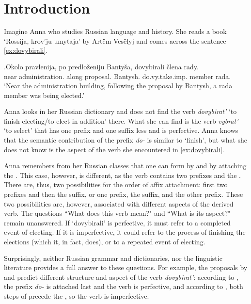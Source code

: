 
\chapter{Introduction} %
\label{Chapter1}
Imagine Anna who studies Russian language and history. She reads a book `Rossija, krov'ju umytaja' by Art\"{e}m Ves\"{e}lyj  and comes across the sentence \ref{ex:dovybirali}.

\exg.\label{ex:dovybirali}Okolo pravlenija, po predlo\v{z}eniju Banty\v{s}a, dovybirali \v{c}lena rady.\\
near administration. along proposal. Bantysh. do.vy.take.imp. member rada.\\
\vspace{0.3em}
`Near the administration building, following the proposal by Bantysh, a rada member was being elected.'

Anna looks in her Russian dictionary and does not find the verb \textit{dovybirat'} `to finish electing/to elect in addition' there.  What she can find is the verb \textit{vybrat'} `to select'  that has one prefix and one suffix less and is perfective. Anna knows that the semantic contribution of the prefix \textit{do-} is similar to `finish', but what she does not know is the aspect of the verb she encountered in \ref{ex:dovybirali}. 

Anna remembers from her Russian classes that one can form  by  and  by attaching the . This case, however, is different, as the verb contains two prefixes and the . There are, thus, two possibilities for the order of affix attachment: first two prefixes and then the suffix, or one prefix, the suffix, and the other prefix. These two possibilities are, however, associated with different aspects of the derived verb. The questions ``What does this verb mean?" and ``What is its aspect?" remain unanswered. If `dovybirali' is perfective, it must refer to a completed event of electing. If it is imperfective, it could refer to the process of finishing the elections (which it, in fact, does), or to a repeated event of electing. 

Surprisingly, neither Russian grammar and dictionaries, nor the linguistic literature provides a full answer to these questions. For example, the proposals by \citet{Svenonius:04b} and \citet{Tatevosov:07} predict different  structure and aspect of the verb \textit{dovybirat'}: according to \citet{Svenonius:04b}, the prefix \textit{do-} is attached last and the verb is perfective, and according to \citet{Tatevosov:07}, both steps of  precede the , so the verb is imperfective.

